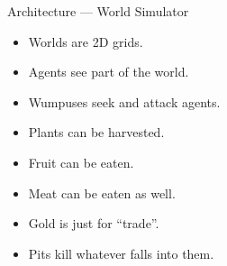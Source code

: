 \begin{frame}{Architecture --- World Simulator}
\begin{center}
      \end{center}
      \begin{itemize}
         \setlength\itemsep{-1.25em}
         \item<1>Worlds are 2D grids.%
         \item<2>Agents see part of the world.%
         \item<3>Wumpuses seek and attack agents.%
         \item<4>Plants can be harvested.%
         \item<5>Fruit can be eaten.%
         \item<6>Meat can be eaten as well.%
         \item<7>Gold is just for ``trade''.%
         \item<8> Pits kill whatever falls into them.%
      \end{itemize}
   \end{frame}
   
